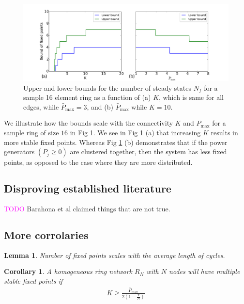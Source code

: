 \documentclass[10pt,aps,pra,onecolumn,superscriptaddress]{revtex4-1}
\newcommand{\debsankha}[1]{\textcolor{magenta}{#1}}
\newtheorem{lemma}{Lemma}
\newtheorem{corr}{Corollary}
\begin{document}
\begin{figure}[htb]
\label{fig:scaling-nf}
\begin{center}
\includegraphics[width=\columnwidth]{pics/num_fps_k_p_ring}
\caption{
Upper and lower bounds for the number of steady states $N_f$ 
for a sample 16 element ring as a function of (a) $K$, which is same for all 
edges, while $\bar{P}_{\max}=3$, and (b) $\bar{P}_{\max}$ while $K=10$.  }
\end{center}
\end{figure}

We illustrate how the bounds scale with the connectivity $K$  and $\bar{P}_{\max}$ for a sample ring 
of size $16$ in  Fig \ref{fig:scaling-nf}. We see in Fig \ref{fig:scaling-nf} 
(a) that increasing $K$ results in more stable fixed points.  Whereas Fig 
\ref{fig:scaling-nf} (b)  demonstrates that if the power generators 
$(P_j\ge  0)$ are clustered together, then the system has less fixed points, 
as opposed to the case where they are more distributed.   


\subsection{Disproving established literature}
\debsankha{TODO}
Barahona et al claimed things that are not true.  

\subsection{More corrolaries}
\begin{lemma}
\label{}
Number of fixed points scales with the average length of cycles.  
\end{lemma}


\begin{corr}
\label{cor:high-k-nf}
A homogeneous ring network $R_{N}$ with $N$ nodes 
 will have multiple stable fixed 
points if 
\begin{align}
\label{crit:mult-fp}
K\geq \frac{\bar{P}_{\max}}{2\left(1-\frac{\pi}{N}\right)}
\end{align}
\end{corr}
\end{document}
